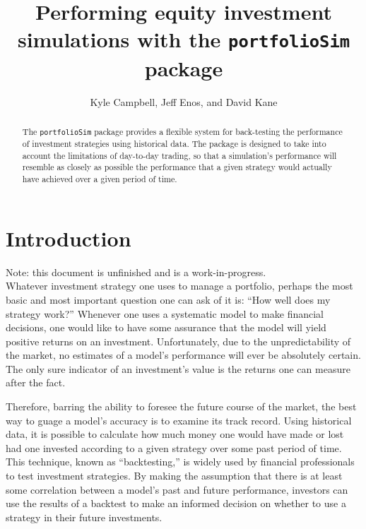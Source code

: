 \documentclass{article}
\begin{document}
\title{Performing equity investment simulations with the \texttt{portfolioSim} package}
\author{Kyle Campbell, Jeff Enos, and David Kane}


\maketitle


\setcounter{secnumdepth}{3}


\begin{abstract}
\label{abstract}

The \texttt{portfolioSim} package provides a flexible system for
back-testing the performance of investment strategies using historical
data.  The package is designed to take into account the limitations of
day-to-day trading, so that a simulation's performance will resemble
as closely as possible the performance that a given strategy would
actually have achieved over a given period of time.

\end{abstract}

\section{Introduction}

Note: this document is unfinished and is a work-in-progress.\\

Whatever investment strategy one uses to manage a portfolio, perhaps
the most basic and most important question one can ask of it is: ``How
well does my strategy work?''  Whenever one uses a systematic model to
make financial decisions, one would like to have some assurance that
the model will yield positive returns on an investment.
Unfortunately, due to the unpredictability of the market, no estimates
of a model's performance will ever be absolutely certain.  The only
sure indicator of an investment's value is the returns one can measure
after the fact.

Therefore, barring the ability to foresee the future course of the
market, the best way to guage a model's accuracy is to examine its
track record.  Using historical data, it is possible to calculate how
much money one would have made or lost had one invested according to a
given strategy over some past period of time.  This technique, known
as ``backtesting,'' is widely used by financial professionals to test
investment strategies.  By making the assumption that there is at
least some correlation between a model's past and future performance,
investors can use the results of a backtest to make an informed
decision on whether to use a strategy in their future investments.
\end{document}

